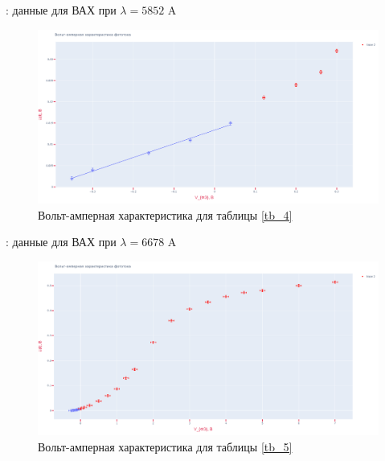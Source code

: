 \documentclass[15pt,a5paper,reqno]{article}
\begin{document}
	\newpage


	\begin{table}[h!]
        \centering
        
        \caption{: данные для ВАХ при $\lambda = 5852$ A}
    	\label{tb_4}
	\end{table}

	\begin{figure}[h!]
		\centering
		\includegraphics[width=1.0\linewidth]{pics/vac_3.png}
		\caption{Вольт-амперная характеристика  для таблицы \ref{tb_4}}
		\label{vac3}
	\end{figure}

	\newpage


	\begin{table}[h!]
        \centering
        
        \caption{: данные для ВАХ при $\lambda = 6678$ A}
    	\label{tb_5}
	\end{table}

	\begin{figure}[h!]
		\centering
		\includegraphics[width=1.0\linewidth]{pics/vac_4.png}
		\caption{Вольт-амперная характеристика  для таблицы \ref{tb_5}}
		\label{vac4}
	\end{figure}

	\newpage
\end{document}

